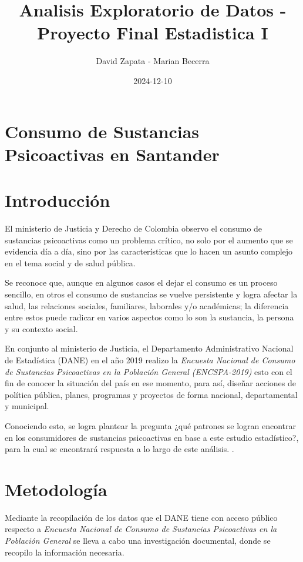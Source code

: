 \documentclass[
]{article}
\title{Analisis Exploratorio de Datos - Proyecto Final Estadistica I}
\author{David Zapata - Marian Becerra}
\date{2024-12-10}
\begin{document}
\maketitle

\section{Consumo de Sustancias Psicoactivas en
Santander}\label{consumo-de-sustancias-psicoactivas-en-santander}

\section{Introducción}\label{introducciuxf3n}

El ministerio de Justicia y Derecho de Colombia observo el consumo de
sustancias psicoactivas como un problema crítico, no solo por el aumento
que se evidencia día a día, sino por las características que lo hacen un
asunto complejo en el tema social y de salud pública.

Se reconoce que, aunque en algunos casos el dejar el consumo es un
proceso sencillo, en otros el consumo de sustancias se vuelve
persistente y logra afectar la salud, las relaciones sociales,
familiares, laborales y/o académicas; la diferencia entre estos puede
radicar en varios aspectos como lo son la sustancia, la persona y su
contexto social.

En conjunto al ministerio de Justicia, el Departamento Administrativo
Nacional de Estadística (DANE) en el año 2019 realizo la \emph{Encuesta
Nacional de Consumo de Sustancias Psicoactivas en la Población General
(ENCSPA-2019)} esto con el fin de conocer la situación del país en ese
momento, para así, diseñar acciones de política pública, planes,
programas y proyectos de forma nacional, departamental y municipal.

Conociendo esto, se logra plantear la pregunta ¿qué patrones se logran
encontrar en los consumidores de sustancias psicoactivas en base a este
estudio estadístico?, para la cual se encontrará respuesta a lo largo de
este análisis. .\\

\section{Metodología}\label{metodologuxeda}

Mediante la recopilación de los datos que el DANE tiene con acceso
público respecto a \emph{Encuesta Nacional de Consumo de Sustancias
Psicoactivas en la Población General} se lleva a cabo una investigación
documental, donde se recopilo la información necesaria.
\end{document}
